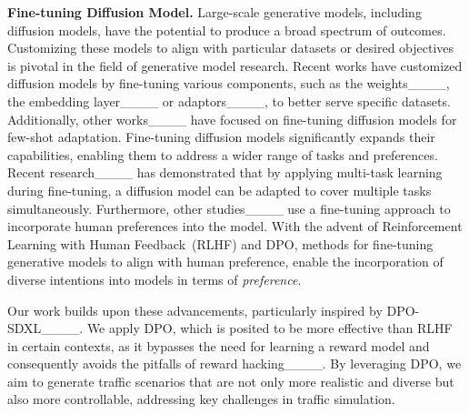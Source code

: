\noindent
{\bf Fine-tuning Diffusion Model.} Large-scale generative models, including diffusion models, have the potential to produce a broad spectrum of outcomes. Customizing these models to align with particular datasets or desired objectives is pivotal in the field of generative model research. Recent works have customized diffusion models by fine-tuning various components, such as the weights____, the embedding layer____ or adaptors____, to better serve specific datasets. Additionally, other works____ have focused on fine-tuning diffusion models for few-shot adaptation. Fine-tuning diffusion models significantly expands their capabilities, enabling them to address a wider range of tasks and preferences. Recent research____ has demonstrated that by applying multi-task learning during fine-tuning, a diffusion model can be adapted to cover multiple tasks simultaneously. Furthermore, other studies____ use a fine-tuning approach to incorporate human preferences into the model. With the advent of Reinforcement Learning with Human Feedback~(RLHF) and DPO, methods for fine-tuning generative models to align with human preference, enable the incorporation of diverse intentions into models in terms of {\it preference}.

Our work builds upon these advancements, particularly inspired by DPO-SDXL____. We apply DPO, which is posited to be more effective than RLHF in certain contexts, as it bypasses the need for learning a reward model and consequently avoids the pitfalls of reward hacking____. By leveraging DPO, we aim to generate traffic scenarios that are not only more realistic and diverse but also more controllable, addressing key challenges in traffic simulation.

